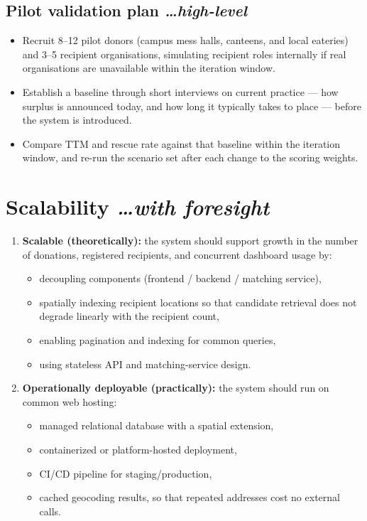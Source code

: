 \documentclass[11pt,a4paper]{article}
\newcommand{\BvrHint}[1]{%
  {\normalfont\normalsize\itshape\hfill #1}}
\begin{document}
\subsection{Pilot validation plan %
\BvrHint{\ldots high-level}}
\begin{itemize}[leftmargin=0.7cm]
    \item Recruit 8--12 pilot donors (campus mess halls, canteens, and local eateries) and 3--5 recipient organisations, simulating recipient roles internally if real organisations are unavailable within the iteration window.
    \item Establish a baseline through short interviews on current practice --- how surplus is announced today, and how long it typically takes to place --- before the system is introduced.
    \item Compare TTM and rescue rate against that baseline within the iteration window, and re-run the scenario set after each change to the scoring weights.
\end{itemize}

\section{Scalability %
\BvrHint{\ldots with foresight}}
\begin{enumerate}[leftmargin=0.7cm]
    \item \textbf{Scalable (theoretically):} the system should support growth in the number of donations, registered recipients, and concurrent dashboard usage by:
    \begin{itemize}[leftmargin=0.7cm]
        \item decoupling components (frontend / backend / matching service),
        \item spatially indexing recipient locations so that candidate retrieval does not degrade linearly with the recipient count,
        \item enabling pagination and indexing for common queries,
        \item using stateless API and matching-service design.
    \end{itemize}

    \item \textbf{Operationally deployable (practically):} the system should run on common web hosting:
    \begin{itemize}[leftmargin=0.7cm]
        \item managed relational database with a spatial extension,
        \item containerized or platform-hosted deployment,
        \item CI/CD pipeline for staging/production,
        \item cached geocoding results, so that repeated addresses cost no external calls.
    \end{itemize}
\end{enumerate}
\end{document}
